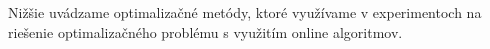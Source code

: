 


Nižšie uvádzame optimalizačné metódy, ktoré využívame v experimentoch na riešenie optimalizačného problému s využitím online algoritmov.

